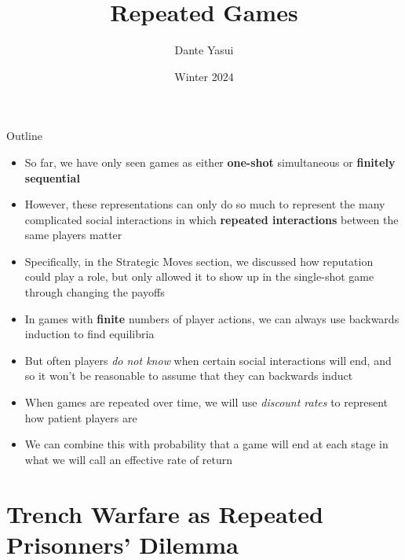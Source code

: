 \documentclass{beamer}
\title{Repeated Games}
\author{Dante Yasui }
\institute{EC327 Game Theory}
\date{Winter 2024}
\theoremstyle{plain}
\begin{document}
\begin{frame}[plain]
    \titlepage
\end{frame}
\addtocounter{framenumber}{-1}

\begin{frame}[plain]{Outline}
  \tableofcontents
\end{frame}
\addtocounter{framenumber}{-1}



\begin{frame}{}
  \begin{itemize}
    \item So far, we have only seen games as either \textbf{one-shot} simultaneous or \textbf{finitely sequential}
    \item However, these representations can only do so much to represent the many complicated social interactions in which \textbf{repeated interactions} between the same players matter
    \item Specifically, in the Strategic Moves section, we discussed how \alert{reputation} could play a role, but only allowed it to show up in the single-shot game through changing the payoffs 
  \end{itemize} 
\end{frame}

\begin{frame}{}
  \begin{itemize}
    \item In games with \textbf{finite} numbers of player actions, 
    we can always use \alert{backwards induction} to find equilibria
    \item But often players \textit{do not know} when certain social interactions will end, 
    and so it won't be reasonable to assume that they can backwards induct
  \end{itemize} 
\end{frame}

\begin{frame}{}
  \begin{itemize}
    \item When games are repeated over time, we will use \textit{discount rates} to represent how patient players are
    \item We can combine this with probability that a game will end at each stage in what we will call an \alert{effective rate of return}
  \end{itemize} 
\end{frame}

\section*{Trench Warfare as Repeated Prisonners' Dilemma}

\end{document}
